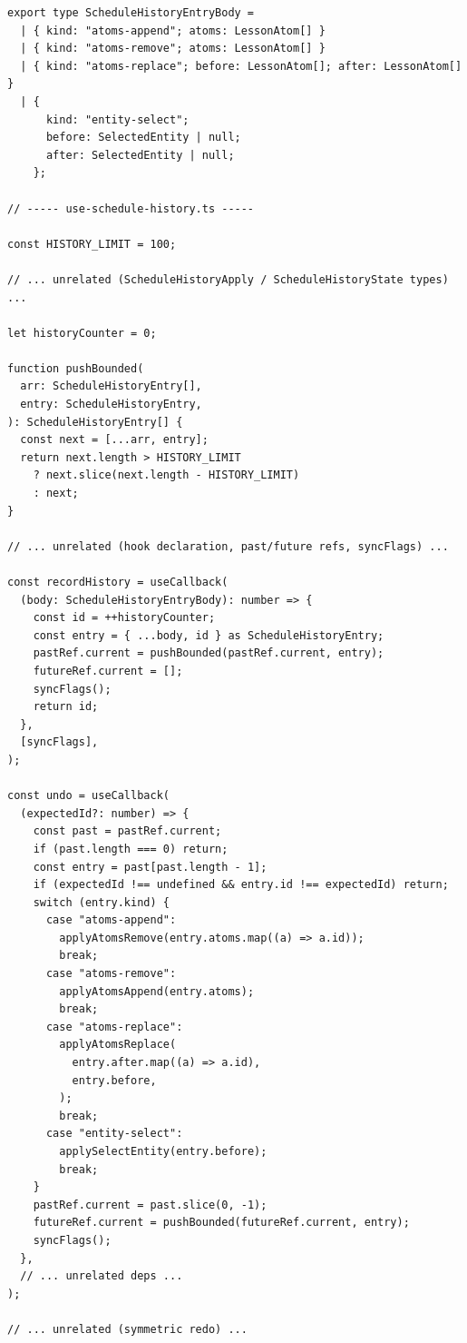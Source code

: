 \begin{lstlisting}[caption={Ограниченный стек undo/redo редактора расписания с дискриминированным объединением действий},label=lst:web-undo-redo]
export type ScheduleHistoryEntryBody =
  | { kind: "atoms-append"; atoms: LessonAtom[] }
  | { kind: "atoms-remove"; atoms: LessonAtom[] }
  | { kind: "atoms-replace"; before: LessonAtom[]; after: LessonAtom[] }
  | {
      kind: "entity-select";
      before: SelectedEntity | null;
      after: SelectedEntity | null;
    };

// ----- use-schedule-history.ts -----

const HISTORY_LIMIT = 100;

// ... unrelated (ScheduleHistoryApply / ScheduleHistoryState types) ...

let historyCounter = 0;

function pushBounded(
  arr: ScheduleHistoryEntry[],
  entry: ScheduleHistoryEntry,
): ScheduleHistoryEntry[] {
  const next = [...arr, entry];
  return next.length > HISTORY_LIMIT
    ? next.slice(next.length - HISTORY_LIMIT)
    : next;
}

// ... unrelated (hook declaration, past/future refs, syncFlags) ...

const recordHistory = useCallback(
  (body: ScheduleHistoryEntryBody): number => {
    const id = ++historyCounter;
    const entry = { ...body, id } as ScheduleHistoryEntry;
    pastRef.current = pushBounded(pastRef.current, entry);
    futureRef.current = [];
    syncFlags();
    return id;
  },
  [syncFlags],
);

const undo = useCallback(
  (expectedId?: number) => {
    const past = pastRef.current;
    if (past.length === 0) return;
    const entry = past[past.length - 1];
    if (expectedId !== undefined && entry.id !== expectedId) return;
    switch (entry.kind) {
      case "atoms-append":
        applyAtomsRemove(entry.atoms.map((a) => a.id));
        break;
      case "atoms-remove":
        applyAtomsAppend(entry.atoms);
        break;
      case "atoms-replace":
        applyAtomsReplace(
          entry.after.map((a) => a.id),
          entry.before,
        );
        break;
      case "entity-select":
        applySelectEntity(entry.before);
        break;
    }
    pastRef.current = past.slice(0, -1);
    futureRef.current = pushBounded(futureRef.current, entry);
    syncFlags();
  },
  // ... unrelated deps ...
);

// ... unrelated (symmetric redo) ...
\end{lstlisting}
